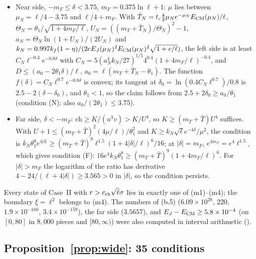 \begin{itemize}
\begin{itemize}
\item[(N)] Near side, $-m_F\le\delta<3.75$, $m_F=0.375\ln\ell+1$: $\mu$ lies between $\mu_N=\ell/4-3.75$ and $\ell/4+m_F$. With $\bar T_N=t_c\frac43\mu_Ne^{-\mu_N}E_{\rm CM}(\mu_N)/\ell$, $\Theta_N=\theta_1/\sqrt{1+4m_F/\ell}$, $U_N=((m_T+\bar T_N)/\Theta_N)^2-1$, $a_N=\Theta_N\ln(1+U_N)/(2U_N)$ and $k_N=0.997k_f(1-\eta)/(2eE_J(\mu_N)^2E_{\rm CM}(\mu_N)^2\sqrt{1+c/\ell})$, the left side is at least $C_N\ell^{-0.3}e^{-0.8\delta}$ with $C_N=5(a_N^4k_N/27)^{1/5}4^{0.4}(1+4m_F/\ell)^{-0.4}$, and $D\le(a_0-2\theta_1\delta)/\ell$, $a_0=\ell(m_T+\bar T_N-\theta_1)$. The function $f(\delta)=C_N\ell^{0.7}e^{-0.8\delta}$ is convex; its tangent at $\delta_0=\ln(0.4C_N\ell^{0.7})/0.8$ is $2.5-2(\delta-\delta_0)$, and $\theta_1<1$, so the claim follows from $2.5+2\delta_0\ge a_0/\theta_1$ (condition (N); also $a_0/(2\theta_1)\le3.75$).
\item[(F)] Far side, $\delta<-m_F$: $\mathrm{ch}\ge K/(u^3v)>K/U^4$, so $K\ge(m_T+\bar T)U^4$ suffices. With $U+1\le(m_T+\bar T)^2(4\mu/\ell)/\theta_1^2$ and $K\ge k_N\sqrt\ell e^{-4\delta}/\mu^2$, the condition is $k_N\theta_1^8e^{4|\delta|}\ge(m_T+\bar T)^9\ell^{1.5}(1+4|\delta|/\ell)^6/16$; at $|\delta|=m_F$, $e^{4m_F}=e^4\ell^{1.5}$, which gives condition (F): $16e^4k_N\theta_1^8\ge(m_T+\bar T)^9(1+4m_F/\ell)^6$. For $|\delta|>m_F$ the logarithm of the ratio has derivative $4-24/(\ell+4|\delta|)\ge3.565>0$ in $|\delta|$, so the condition persists.
\end{itemize}
\end{itemize}
Every state of Case~II with $r>c_{\rm ch}\sqrt\ell\sigma$ lies in exactly one of (m1)--(m4); the boundary $\xi=\ell^2$ belongs to (m4).
The numbers of (b.5) ($6.09\times10^{28}$, $220$, $1.9\times10^{-160}$, $3.4\times10^{-159}$), the far side ($3.5657$), and $E_J-E_{\rm CM}\ge5.8\times10^{-4}$ (on $[0,80]$ in $8{,}000$ pieces and $[80,\infty)$) were also computed in interval arithmetic ().

\subsection{Proposition~\ref{prop:wide}: 35 conditions}

